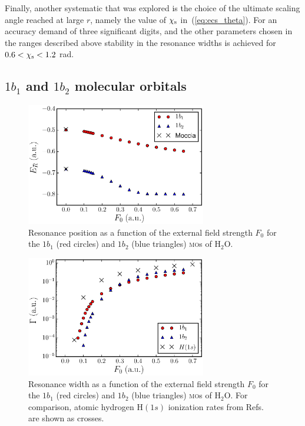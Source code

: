Finally, another systematic that was explored is the choice of the
ultimate scaling angle reached at large $r$, namely the value of
$\chi_{\rm{s}}$ in~(\ref{eq:ecs_theta}). For an accuracy demand of
three significant digits, and the other parameters chosen in the
ranges described above stability in the resonance widths is achieved
for $0.6< \chi_{\rm{s}} < 1.2$ rad.


\subsection{$1b_{1}$ and $1b_{2}$ molecular orbitals}
\label{ch:1b1_1b2_results}


\begin{figure}
  \centering
  \includegraphics[width=0.7\textwidth]{figures/ch_H2O/1b1_1b2/resPositionvsF1b11b2.eps}
  \caption{Resonance position as a function of the external field
    strength $F_{0}$ for the $1b_{1}$ (red circles) and $1b_{2}$ (blue
    triangles) \textsc{mo}s of H$_{2}$O.}
  \label{fig:1b11b2_position}
\end{figure}

\begin{figure}
  \centering
  \includegraphics[width=0.7\textwidth]{figures/ch_H2O/1b1_1b2/resWidthvsF1b11b2H1s.eps}
  \caption{Resonance width as a function of the external field
    strength $F_{0}$ for the $1b_{1}$ (red circles) and $1b_{2}$ (blue
    triangles) \textsc{mo}s of H$_{2}$O. For comparison, atomic
    hydrogen H$(1s)$ ionization rates from
    Refs.~\cite{Telnov_1989,Kolosov_1987} are shown as crosses.}
  \label{fig:1b11b2_width}
\end{figure}

